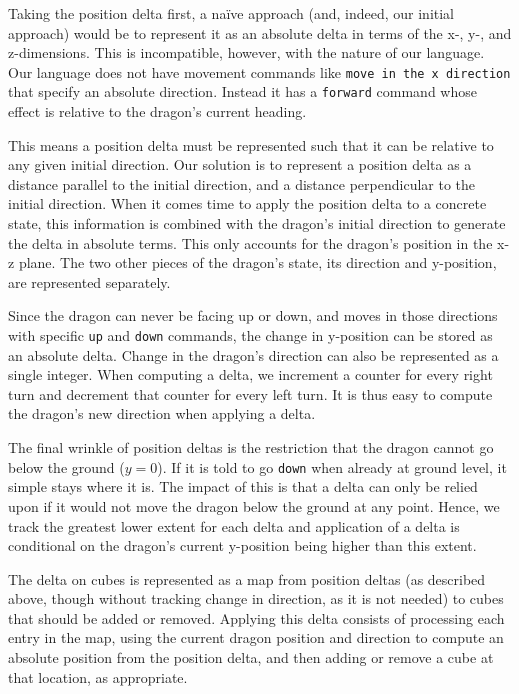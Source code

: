 \documentclass{sig-alternate}
\begin{document}
Taking the position delta first, a na\"{i}ve approach (and, indeed, our initial approach) would be to represent it as an absolute delta in terms of the x-, y-, and z-dimensions. This is incompatible, however, with the nature of our language. Our language does not have movement commands like \texttt{move in the x direction} that specify an absolute direction. Instead it has a \texttt{forward} command whose effect is relative to the dragon's current heading. 

This means a position delta must be represented such that it can be relative to any given initial direction. Our solution is to represent a position delta as a distance parallel to the initial direction, and a distance perpendicular to the initial direction. When it comes time to apply the position delta to a concrete state, this information is combined with the dragon's initial direction to generate the delta in absolute terms. This only accounts for the dragon's position in the x-z plane. The two other pieces of the dragon's state, its direction and y-position, are represented separately. 

Since the dragon can never be facing up or down, and moves in those directions with specific \texttt{up} and \texttt{down} commands, the change in y-position can be stored as an absolute delta. Change in the dragon's direction can also be represented as a single integer. When computing a delta, we increment a counter for every right turn and decrement that counter for every left turn. It is thus easy to compute the dragon's new direction when applying a delta.

The final wrinkle of position deltas is the restriction that the dragon cannot go below the ground ($y=0$). If it is told to go \texttt{down} when already at ground level, it simple stays where it is. The impact of this is that a delta can only be relied upon if it would not move the dragon below the ground at any point. Hence, we track the greatest lower extent for each delta and application of a delta is conditional on the dragon's current y-position being higher than this extent. 

The delta on cubes is represented as a map from position deltas (as described above, though without tracking change in direction, as it is not needed) to cubes that should be added or removed. Applying this delta consists of processing each entry in the map, using the current dragon position and direction to compute an absolute position from the position delta, and then adding or remove a cube at that location, as appropriate.
\end{document}
